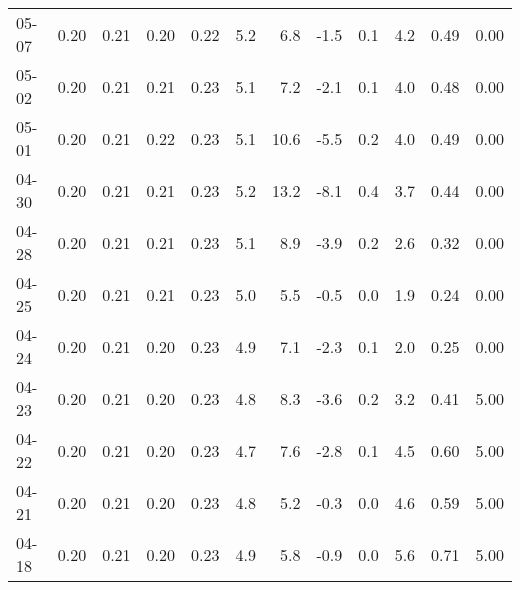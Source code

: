 \begin{threeparttable}
{\begin{tabular}{lrrrrrrrrrrr}
  05-07 &          0.20 &          0.21 &          0.20 &        0.22 &                 5.2 &                 6.8 &       -1.5 &                 0.1 &              4.2 &            0.49 &                   0.00 \\
  05-02 &          0.20 &          0.21 &          0.21 &        0.23 &                 5.1 &                 7.2 &       -2.1 &                 0.1 &              4.0 &            0.48 &                   0.00 \\
  05-01 &          0.20 &          0.21 &          0.22 &        0.23 &                 5.1 &                10.6 &       -5.5 &                 0.2 &              4.0 &            0.49 &                   0.00 \\
  04-30 &          0.20 &          0.21 &          0.21 &        0.23 &                 5.2 &                13.2 &       -8.1 &                 0.4 &              3.7 &            0.44 &                   0.00 \\
  04-28 &          0.20 &          0.21 &          0.21 &        0.23 &                 5.1 &                 8.9 &       -3.9 &                 0.2 &              2.6 &            0.32 &                   0.00 \\
  04-25 &          0.20 &          0.21 &          0.21 &        0.23 &                 5.0 &                 5.5 &       -0.5 &                 0.0 &              1.9 &            0.24 &                   0.00 \\
  04-24 &          0.20 &          0.21 &          0.20 &        0.23 &                 4.9 &                 7.1 &       -2.3 &                 0.1 &              2.0 &            0.25 &                   0.00 \\
  04-23 &          0.20 &          0.21 &          0.20 &        0.23 &                 4.8 &                 8.3 &       -3.6 &                 0.2 &              3.2 &            0.41 &                   5.00 \\
  04-22 &          0.20 &          0.21 &          0.20 &        0.23 &                 4.7 &                 7.6 &       -2.8 &                 0.1 &              4.5 &            0.60 &                   5.00 \\
  04-21 &          0.20 &          0.21 &          0.20 &        0.23 &                 4.8 &                 5.2 &       -0.3 &                 0.0 &              4.6 &            0.59 &                   5.00 \\
  04-18 &          0.20 &          0.21 &          0.20 &        0.23 &                 4.9 &                 5.8 &       -0.9 &                 0.0 &              5.6 &            0.71 &                   5.00 \\

\end{tabular}}
\end{threeparttable}

